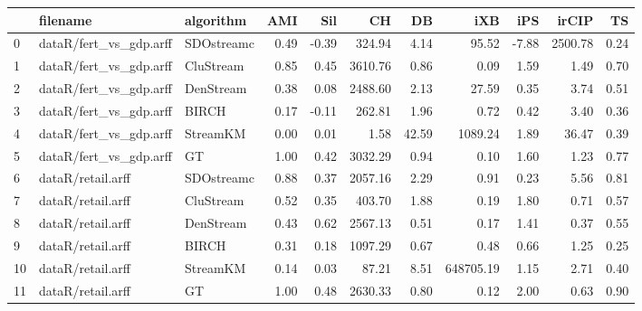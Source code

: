 \begin{tabular}{lllrrrrrrrr}
\toprule
{} &                filename &   algorithm &  AMI &   Sil &      CH &    DB &       iXB &   iPS &   irCIP &   TS \\
\midrule
0  &  dataR/fert\_vs\_gdp.arff &  SDOstreamc & 0.49 & -0.39 &  324.94 &  4.14 &     95.52 & -7.88 & 2500.78 & 0.24 \\
1  &  dataR/fert\_vs\_gdp.arff &   CluStream & 0.85 &  0.45 & 3610.76 &  0.86 &      0.09 &  1.59 &    1.49 & 0.70 \\
2  &  dataR/fert\_vs\_gdp.arff &   DenStream & 0.38 &  0.08 & 2488.60 &  2.13 &     27.59 &  0.35 &    3.74 & 0.51 \\
3  &  dataR/fert\_vs\_gdp.arff &       BIRCH & 0.17 & -0.11 &  262.81 &  1.96 &      0.72 &  0.42 &    3.40 & 0.36 \\
4  &  dataR/fert\_vs\_gdp.arff &    StreamKM & 0.00 &  0.01 &    1.58 & 42.59 &   1089.24 &  1.89 &   36.47 & 0.39 \\
5  &  dataR/fert\_vs\_gdp.arff &          GT & 1.00 &  0.42 & 3032.29 &  0.94 &      0.10 &  1.60 &    1.23 & 0.77 \\
6  &       dataR/retail.arff &  SDOstreamc & 0.88 &  0.37 & 2057.16 &  2.29 &      0.91 &  0.23 &    5.56 & 0.81 \\
7  &       dataR/retail.arff &   CluStream & 0.52 &  0.35 &  403.70 &  1.88 &      0.19 &  1.80 &    0.71 & 0.57 \\
8  &       dataR/retail.arff &   DenStream & 0.43 &  0.62 & 2567.13 &  0.51 &      0.17 &  1.41 &    0.37 & 0.55 \\
9  &       dataR/retail.arff &       BIRCH & 0.31 &  0.18 & 1097.29 &  0.67 &      0.48 &  0.66 &    1.25 & 0.25 \\
10 &       dataR/retail.arff &    StreamKM & 0.14 &  0.03 &   87.21 &  8.51 & 648705.19 &  1.15 &    2.71 & 0.40 \\
11 &       dataR/retail.arff &          GT & 1.00 &  0.48 & 2630.33 &  0.80 &      0.12 &  2.00 &    0.63 & 0.90 \\
\bottomrule
\end{tabular}
